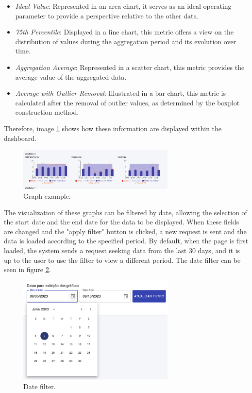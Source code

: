\begin{itemize}
    \item \textit{Ideal Value}: Represented in an area chart, it serves as an ideal operating parameter to provide a perspective relative to the other data.
    \item \textit{75th Percentile}: Displayed in a line chart, this metric offers a view on the distribution of values during the aggregation period and its evolution over time.
    \item \textit{Aggregation Average}: Represented in a scatter chart, this metric provides the average value of the aggregated data.
    \item \textit{Average with Outlier Removal}: Illustrated in a bar chart, this metric is calculated after the removal of outlier values, as determined by the boxplot construction method.
\end{itemize}

Therefore, image \ref{fig:graphData} shows how these information are displayed within the dashboard.

\begin{figure}[htbp]
	\centering
	\includegraphics[width=0.7\textwidth]{images/graphData.png}
	\caption{Graph example.}
	\label{fig:graphData}
\end{figure}


The visualization of these graphs can be filtered by date, allowing the selection of the start date and the end date for the data to be displayed. When these fields are changed and the "apply filter" button is clicked, a new request is sent and the data is loaded according to the specified period. By default, when the page is first loaded, the system sends a request seeking data from the last 30 days, and it is up to the user to use the filter to view a different period. The date filter can be seen in figure \ref{fig:loadDataByDate}.

\begin{figure}[htbp]
	\centering
	\includegraphics[width=0.7\textwidth]{images/datetimeFilter.png}
	\caption{Date filter.}
	\label{fig:loadDataByDate}
\end{figure}

